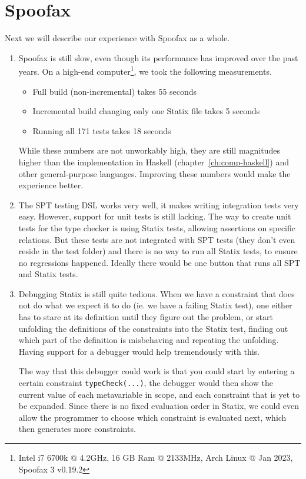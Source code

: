\section{Spoofax}

Next we will describe our experience with Spoofax as a whole. 

\begin{enumerate}
	\item Spoofax is still slow, even though its performance has improved over the past years. On a high-end computer\footnote{Intel i7 6700k @ 4.2GHz, 16 GB Ram @ 2133MHz, Arch Linux @ Jan 2023, Spoofax 3 v0.19.2}, we took the following measurements.
	\begin{itemize}
		\item Full build (non-incremental) takes 55 seconds
		\item Incremental build changing only one Statix file takes 5 seconds
		\item Running all 171 tests takes 18 seconds
	\end{itemize}
	While these numbers are not unworkably high, they are still magnitudes higher than the implementation in Haskell (chapter~\ref{ch:comp-haskell}) and other general-purpose languages. Improving these numbers would make the experience better.
	
	\item The SPT testing DSL works very well, it makes writing integration tests very easy. However, support for unit tests is still lacking. The way to create unit tests for the type checker is using Statix tests, allowing assertions on specific relations. But these tests are not integrated with SPT tests (they don't even reside in the test folder) and there is no way to run all Statix tests, to ensure no regressions happened. Ideally there would be one button that runs all SPT and Statix tests.
	
	\item Debugging Statix is still quite tedious. When we have a constraint that does not do what we expect it to do (ie. we have a failing Statix test), one either has to stare at its definition until they figure out the problem, or start unfolding the definitions of the constraints into the Statix test, finding out which part of the definition is misbehaving and repeating the unfolding. Having support for a debugger would help tremendously with this.
	
	The way that this debugger could work is that you could start by entering a certain constraint \verb|typeCheck(...)|, the debugger would then show the current value of each metavariable in scope, and each constraint that is yet to be expanded. Since there is no fixed evaluation order in Statix, we could even allow the programmer to choose which constraint is evaluated next, which then generates more constraints.
\end{enumerate}

